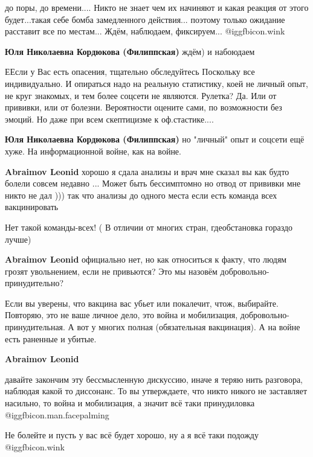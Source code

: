 \begin{itemize}
\begin{itemize}
до поры, до времени.... Никто не знает чем их начиняют и какая реакция от этого
будет...такая себе бомба замедленного действия... поэтому только ожидание
расставит все по местам... Ждём, наблюдаем, фиксируем...  @igg{fbicon.wink} 

\textbf{Юля Николаевна Кордюкова (Филиппская)} ждём) и набоюдаем


ЕЕсли у Вас есть опасения, тщательно обследуйтесь Поскольку все индивидуально.
И опираться надо на реальную статистику, коей не личный опыт, не круг знакомых,
и тем более соцсети не являются. Рулетка? Да. Или от прививки, или от болезни.
Вероятности оцените сами, по возможности без эмоций. Но даже при всем
скептицизме к оф.стастике....

\textbf{Юля Николаевна Кордюкова (Филиппская)} но "личный" опыт и соцсети ещё хуже. На информационной войне, как на войне.

\textbf{Abraimov Leonid} хорошо я сдала анализы и врач мне сказал вы как будто болели совсем недавно ... Может быть бессимптомно но отвод от прививки мне никто не дал ))) так что анализы до одного места если есть команда всех вакцинировать

Нет такой команды-всех! ( В отличии от многих стран, гдеобстановка гораздо лучше)

\textbf{Abraimov Leonid} официально нет, но как относиться к факту, что людям грозят увольнением, если не привьются? Это мы назовём добровольно-принудительно?


Если вы уверены, что вакцина вас убьет или покалечит, чтож, выбирайте.
Повторяю, это не ваше личное дело, это война и мобилизация,
добровольно-принудительная. А вот у многих полная (обязательная вакцинация). А
на войне есть раненные и убитые.

\textbf{Abraimov Leonid} 

давайте закончим эту бессмысленную дискуссию, иначе я теряю нить разговора,
наблюдая какой то диссонанс. То вы утверждаете, что никто никого не заставляет
насильно, то война и мобилизация, а значит всё таки принудиловка  @igg{fbicon.man.facepalming} 

Не болейте и пусть у вас всё будет хорошо, ну а я всё таки подожду  @igg{fbicon.wink} 



\end{itemize}
\end{itemize}
